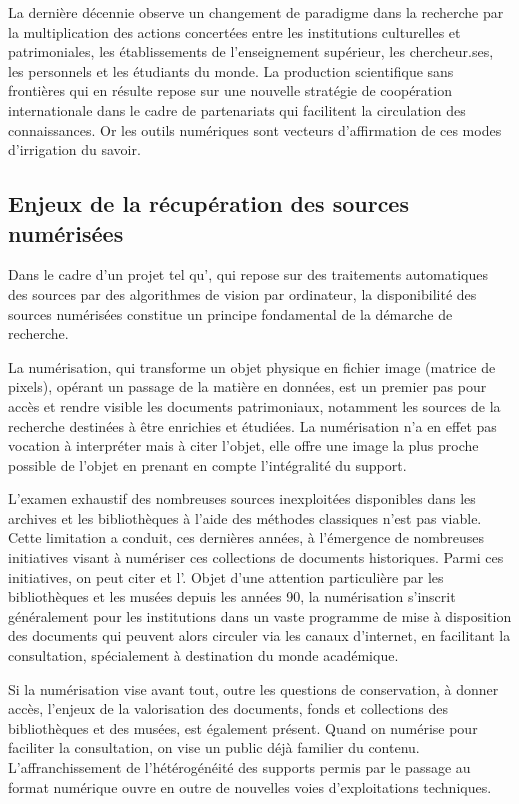 La dernière décennie observe un changement de paradigme dans la
recherche par la multiplication des actions concertées entre les
institutions culturelles et patrimoniales, les établissements de
l'enseignement supérieur, les chercheur.ses, les personnels et les
étudiants du monde. La production scientifique sans frontières qui en
résulte repose sur une nouvelle stratégie de coopération internationale
dans le cadre de partenariats qui facilitent la circulation des
connaissances. Or les outils numériques sont vecteurs d'affirmation de
ces modes d'irrigation du savoir.

\hypertarget{enjeux-de-la-recuperation-des-sources-numerisees}{%
\subsection{Enjeux de la récupération des sources
numérisées}\label{enjeux-de-la-recuperation-des-sources-numerisees}}

Dans le cadre d'un projet tel qu'\eida, qui repose sur des traitements
automatiques des sources par des algorithmes de vision par ordinateur,
la disponibilité des sources numérisées constitue un principe
fondamental de la démarche de recherche.

La numérisation, qui transforme un objet physique en fichier image
(matrice de pixels), opérant un passage de la matière en données, est un
premier pas pour accès et rendre visible les documents
patrimoniaux, notamment les sources de la recherche destinées à être
enrichies et étudiées. La numérisation n'a en effet pas vocation à
interpréter mais à citer l'objet, elle offre une image la plus proche
possible de l'objet en prenant en compte l'intégralité du support.

L'examen exhaustif des nombreuses sources inexploitées disponibles dans
les archives et les bibliothèques à l'aide des méthodes classiques n'est
pas viable. Cette limitation a conduit, ces dernières années, à
l'émergence de nombreuses initiatives visant à numériser ces collections
de documents historiques. Parmi ces initiatives, on peut citer \gbs et l'\oca. Objet d'une
attention particulière par les bibliothèques et les musées depuis les
années 90, la numérisation s'inscrit généralement pour les institutions
dans un vaste programme de mise à disposition des documents qui peuvent
alors circuler via les canaux d'internet, en facilitant la consultation,
spécialement à destination du monde académique.

Si la numérisation vise avant tout, outre les questions de conservation, à donner accès, l'enjeux de la
valorisation des documents, fonds et collections des bibliothèques et
des musées, est également présent. Quand on numérise pour faciliter la
consultation, on vise un public déjà familier du contenu.
L'affranchissement de l'hétérogénéité des supports permis par le passage
au format numérique ouvre en outre de nouvelles voies d'exploitations
techniques.

